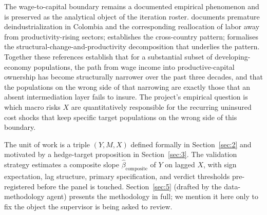 The wage-to-capital boundary remains a documented empirical phenomenon and
is preserved as the analytical object of the iteration roster.
\citet{mendieta_munoz_2017} documents premature deindustrialization in
Colombia and the corresponding reallocation of labor away from
productivity-rising sectors; \citet{rodrik_2016} establishes the
cross-country pattern; \citet{mcmillan_rodrik_2011} formalises the
structural-change-and-productivity decomposition that underlies the
pattern. Together these references establish that for a substantial subset
of developing-economy populations, the path from wage income into
productive-capital ownership has become structurally narrower over the past
three decades, and that the populations on the wrong side of that
narrowing are exactly those that an absent intermediation layer fails to
insure. The project's empirical question is which macro risks \(X\) are
quantitatively responsible for the recurring uninsured cost shocks that
keep specific target populations on the wrong side of this boundary.

The unit of work is a triple \((Y, M, X)\) defined formally in
Section~\ref{sec:2} and motivated by a hedge-target proposition in
Section~\ref{sec:3}. The validation strategy estimates a composite slope
\(\hat{\beta}_{\mathrm{composite}}\) of \(Y\) on lagged \(X\), with sign
expectation, lag structure, primary specification, and verdict thresholds
pre-registered before the panel is touched. Section~\ref{sec:5} (drafted by
the data-methodology agent) presents the methodology in full; we mention it
here only to fix the object the supervisor is being asked to review.

